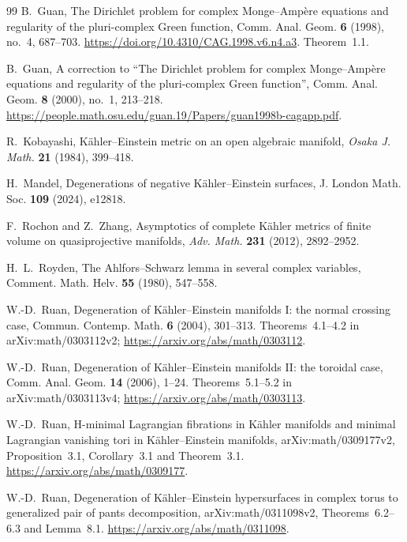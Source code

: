 \documentclass[a4paper,11pt]{ltjsarticle}
\numberwithin{equation}{section}
\theoremstyle{plain}
\theoremstyle{definition}
\theoremstyle{remark}
\begin{document}
\begin{thebibliography}{99}
B.~Guan,
\newblock The Dirichlet problem for complex Monge--Amp\`ere equations and regularity of the pluri-complex Green function,
\newblock Comm. Anal. Geom. \textbf{6} (1998), no.~4, 687--703.
\newblock \url{https://doi.org/10.4310/CAG.1998.v6.n4.a3}.
\newblock Theorem~1.1.

B.~Guan,
\newblock A correction to ``The Dirichlet problem for complex Monge--Amp\`ere equations and regularity of the pluri-complex Green function'',
\newblock Comm. Anal. Geom. \textbf{8} (2000), no.~1, 213--218.
\newblock \url{https://people.math.osu.edu/guan.19/Papers/guan1998b-cagapp.pdf}.

R.~Kobayashi,
\newblock Kähler--Einstein metric on an open algebraic manifold,
\newblock \emph{Osaka J. Math.} \textbf{21} (1984), 399--418.

H.~Mandel,
\newblock Degenerations of negative K\"ahler--Einstein surfaces,
\newblock J. London Math. Soc. \textbf{109} (2024), e12818.

F.~Rochon and Z.~Zhang,
\newblock Asymptotics of complete Kähler metrics of finite volume on quasiprojective manifolds,
\newblock \emph{Adv. Math.} \textbf{231} (2012), 2892--2952.

H.~L.~Royden,
\newblock The Ahlfors--Schwarz lemma in several complex variables,
\newblock Comment. Math. Helv. \textbf{55} (1980), 547--558.

W.-D.~Ruan,
\newblock Degeneration of K\"ahler--Einstein manifolds I: the normal crossing case,
\newblock Commun. Contemp. Math. \textbf{6} (2004), 301--313.
\newblock Theorems~4.1--4.2 in arXiv:math/0303112v2;
\url{https://arxiv.org/abs/math/0303112}.

W.-D.~Ruan,
\newblock Degeneration of K\"ahler--Einstein manifolds II: the toroidal case,
\newblock Comm. Anal. Geom. \textbf{14} (2006), 1--24.
\newblock Theorems~5.1--5.2 in arXiv:math/0303113v4;
\url{https://arxiv.org/abs/math/0303113}.

W.-D.~Ruan,
\newblock H-minimal Lagrangian fibrations in K\"ahler manifolds and minimal Lagrangian vanishing tori in K\"ahler--Einstein manifolds,
\newblock arXiv:math/0309177v2, Proposition~3.1, Corollary~3.1 and Theorem~3.1.
\newblock \url{https://arxiv.org/abs/math/0309177}.

W.-D.~Ruan,
\newblock Degeneration of K\"ahler--Einstein hypersurfaces in complex torus to generalized pair of pants decomposition,
\newblock arXiv:math/0311098v2, Theorems~6.2--6.3 and Lemma~8.1.
\newblock \url{https://arxiv.org/abs/math/0311098}.


\end{thebibliography}
\end{document}
